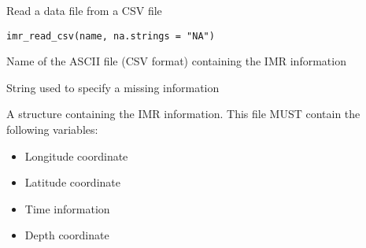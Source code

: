 %
\begin{Description}\relax
Read a data file from a CSV file
\end{Description}
%
\begin{Usage}
\begin{verbatim}
imr_read_csv(name, na.strings = "NA")
\end{verbatim}
\end{Usage}
%
\begin{Arguments}
\begin{ldescription}
\item[\code{name}] 
Name of the ASCII file (CSV format) containing the IMR information

\item[\code{na.strings}] 
String used to specify a missing information

\end{ldescription}
\end{Arguments}
%
\begin{Value}
A  structure containing the IMR information.
This file MUST contain the following variables:
\begin{itemize}

\item Longitude coordinate
\item Latitude coordinate
\item Time information
\item Depth coordinate

\end{itemize}

\end{Value}
